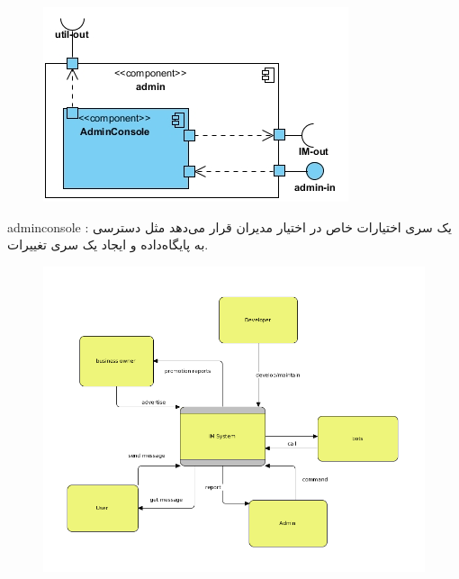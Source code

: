 \begin{figure}[H]
\centering
\includegraphics[scale=.5]{img/admin.jpg}
\caption{}

\end{figure}

\begin{itemize}

	

	 adminconsole : یک سری اختیارات خاص در اختیار مدیران قرار می‌دهد مثل دسترسی به پایگاه‌داده و ایجاد یک سری تغییرات.



\end{itemize}





\begin{figure}[H]
\centering
\includegraphics[scale=.5]{img/context.png}
\caption{}

\end{figure}


